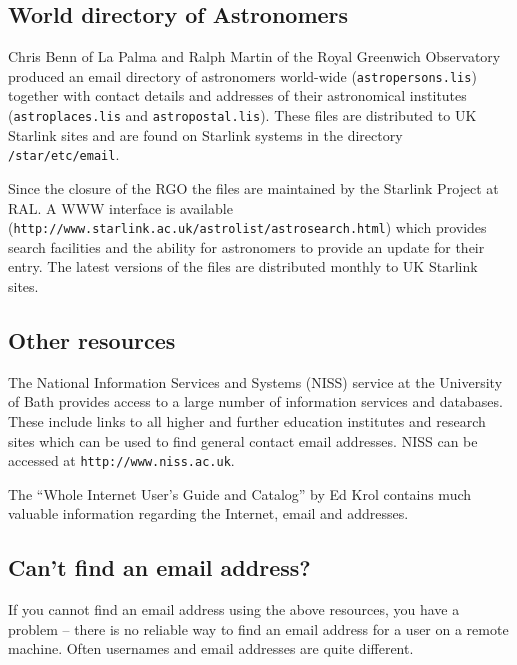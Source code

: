 \documentclass[twoside,11pt]{article}
\newcommand{\htmladdnormallink}[2]{#1}
\newcommand{\latex}[1]{#1}
\newcommand{\xlabel}[1]{}
\renewcommand{\_}{\texttt{\symbol{95}}}
\begin{document}
\subsection{\xlabel{world_directory_of_astronomers}World directory of
Astronomers} \label{world_directory_of_astronomers}

Chris Benn of La Palma and Ralph Martin of the Royal Greenwich
Observatory produced an email directory of astronomers world-wide
(\texttt{astropersons.lis}) together with contact details and addresses
of their astronomical institutes (\texttt{astroplaces.lis} and
\texttt{astropostal.lis}).  These files are distributed to UK Starlink
sites and are found on Starlink systems in the
directory \texttt{/star/etc/email}.

Since the closure of the RGO the files are maintained by the
Starlink Project at RAL.  A \htmladdnormallink{WWW interface is
available}{http://www.starlink.ac.uk/astrolist/astrosearch.html}
\latex{(\texttt{http://www.starlink.ac.uk/astrolist/astrosearch.html})}
which provides search facilities and the ability for astronomers to
provide an update for their entry.  The latest versions of the files are
distributed monthly to UK Starlink sites.

\subsection{\xlabel{other_resources}Other resources}
\label{other_resources}

The National Information Services and Systems (NISS) service at the
University of Bath provides access to a large number of information
services and databases.  These include links to all higher and further
education institutes and research sites which can be used to find general
contact email addresses.  NISS can be accessed at
\htmladdnormallink{\texttt{http://www.niss.ac.uk}}{http://www.niss.ac.uk}.

The ``Whole Internet User's Guide and Catalog'' by Ed Krol contains
much valuable information regarding the Internet, email and addresses.

\subsection{\xlabel{cant_find_an_email_address}Can't find an email address?}
\label{cant_find_an_email_address}

If you cannot find an email address using the above resources, you have a
problem -- there is no reliable way to find an email address for a user
on a remote machine.  Often usernames and email addresses are quite different.
\end{document}
